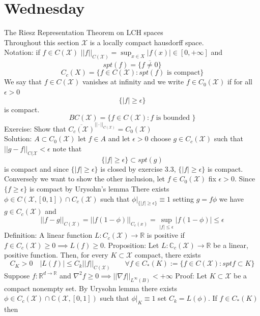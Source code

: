 \documentclass[11pt]{article}
\begin{document}
\section{Wednesday}
The Riesz Representation Theorem on LCH spaces\\
Throughout this section $ \mathcal{X}$ is a locally compact hausdorff space.\\
Notation: if $f \in C( \mathcal{X})$ $||f||_{C( \mathcal{X})} = \sup_{x \in X} |f(x)| \in [0, +\infty]$ and
\[
    spt(f) = \overline{ \{f \ne 0\}}
\] 
\[
    C_c( X) = \{f \in C( \mathcal{X}) : spt(f) \text{ is compact}\}
\] 
We say that $f \in C( \mathcal{X})$ vanishes at infinity and we write  $f \in C_0( \mathcal{X})$ if for all $\epsilon > 0$
\[
    \{|f| \ge \epsilon\}
\] 
is compact.\\
\[
    BC( \mathcal{X}) = \{f \in C( \mathcal{X}) : f \text{ is bounded }\}
\] 
Exercise:
Show that $\overline{C_c( \mathcal{X})}^{||\cdot||_{C( \mathcal{X})}} = C_0( \mathcal{X})$\\
Solution: $A \subset C_0( \mathcal{X})$ let $f \in A$ and let  $\epsilon > 0$ choose $g \in C_c ( \mathcal{X})$ such that $||g - f||_{C( \mathcal{X}} < \epsilon$ note that
\[
    \{|f| \ge \epsilon\} \subset spt(g)
\] 
is compact and since $\{|f| \ge \epsilon\}$ is closed by exercise 3.3, $\{|f| \ge \epsilon\}$ is compact.
Conversely we want to show the other inclusion, let $f \in C_0( \mathcal{X})$ fix $\epsilon > 0$. Since $\{f \ge \epsilon\}$ is compact by Urysohn's lemma
There exists $\phi \in C( \mathcal{X},[0,1]) \cap C_c( \mathcal{X})$   such that $\phi|_{\{|f| \ge \epsilon\}} \equiv 1$ setting $g = f \phi$ we have $g \in C_c( \mathcal{X})$ and
\[
    ||f-g||_{C( \mathcal{X})} = ||f(1-\phi)||_{C_c(x)} = \sup_{|f| \le \epsilon} |f ( 1- \phi)| \le \epsilon
\] 
Definition: A linear function $L : C_c( \mathcal{X}) \to \mathbb{R}$ is positive if $f \in C_c( \mathcal{X}) \ge 0 \implies L(f) \ge 0$.
Proposition: Let $L : \mathbb{C}_c( \mathcal{X}) \to \mathbb{R}$ be a linear, positive function. Then, for every $K \subset \mathcal{X}$ compact, there exists 
\[
    C_K > 0  \quad |L(f)| \le C_k ||f||_{ C( \mathcal{X})} \qquad \forall f \in C_*(K) := \{f \in C( \mathcal{X}) : spt f \subset K\}
\] 
Suppose $f : \mathbb{R}^{d \to \mathbb{R}}$ and $\nabla^2 f \ge 0 \implies || \nabla f||_{L^{\infty}(B)} < +\infty$
Proof: Let $K \subset \mathcal{X}$ be a compact nonempty set. By Urysohn lemma there exists $\phi \in C_c( \mathcal{X}) \cap \mathbb{C}( \mathcal{X}, [0,1])$ such that $\phi|_{K} \equiv 1$ set $C_k = L(\phi)$.
If $f \in C_*(K)$ then
\end{document}
